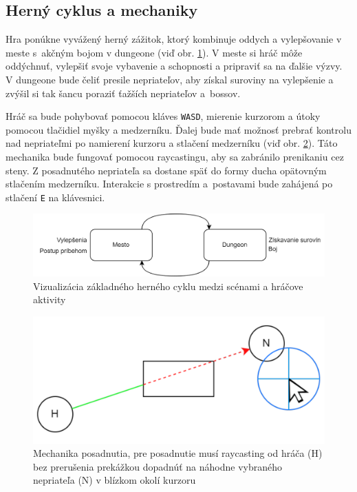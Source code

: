 \subsection{Herný cyklus a mechaniky}

Hra ponúkne vyvážený herný zážitok, ktorý kombinuje oddych a vylepšovanie v meste s~akčným bojom v dungeone (viď obr. \ref{fig:cycle}). V meste si hráč môže oddýchnuť, vylepšiť svoje vybavenie a schopnosti a pripraviť sa na ďalšie výzvy. V dungeone bude čeliť presile nepriateľov, aby získal suroviny na vylepšenie a zvýšil si tak šancu poraziť ťažších nepriateľov a~bossov.

Hráč sa bude pohybovať pomocou kláves \verb|WASD|, mierenie kurzorom a útoky pomocou tlačidiel myšky a medzerníku. Ďalej bude mať možnosť prebrať kontrolu nad nepriateľmi po namierení kurzoru a stlačení medzerníku (viď obr. \ref{fig:possess}). Táto mechanika bude fungovať pomocou raycastingu, aby sa zabránilo prenikaniu cez steny. Z posadnutého nepriateľa sa dostane späť do formy ducha opätovným stlačením medzerníku. Interakcie s prostredím a~postavami bude zahájená po stlačení \verb|E| na klávesnici.

\begin{figure}[H]
    \centering
    \includegraphics[width=1\linewidth]{obrazky-figures/cycle.png}
    \caption{Vizualizácia základného herného cyklu medzi scénami a hráčove aktivity}
    \label{fig:cycle}
\end{figure}

\begin{figure}
    \centering
    \includegraphics[width=0.5\linewidth]{obrazky-figures/possess.png}
    \caption{Mechanika posadnutia, pre posadnutie musí raycasting od hráča (H) bez prerušenia prekážkou dopadnúť na náhodne vybraného nepriateľa (N) v blízkom okolí kurzoru}
    \label{fig:possess}
\end{figure}

